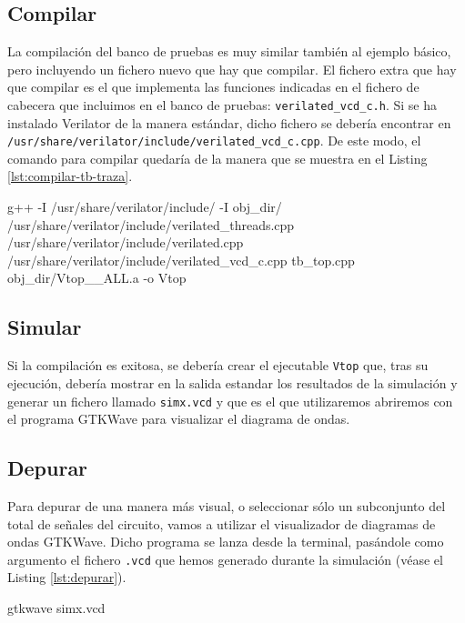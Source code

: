 \subsection{Compilar}
La compilación del banco de pruebas es muy similar también al ejemplo básico, pero incluyendo un fichero nuevo que hay que compilar. El fichero extra que hay que compilar es el que implementa las funciones indicadas en el fichero de cabecera que incluimos en el banco de pruebas: \verb|verilated_vcd_c.h|. Si se ha instalado Verilator de la manera estándar, dicho fichero se debería encontrar en \linebreak\verb|/usr/share/verilator/include/verilated_vcd_c.cpp|. De este modo, el comando para compilar quedaría de la manera que se muestra en el Listing \ref{lst:compilar-tb-traza}.

\begin{mycode}[style=bashstyle, label=lst:compilar-tb-traza, caption={Compilación del banco de pruebas incluyendo el fichero necesario para crear trazas.}]
g++ -I /usr/share/verilator/include/ -I obj_dir/ /usr/share/verilator/include/verilated_threads.cpp /usr/share/verilator/include/verilated.cpp /usr/share/verilator/include/verilated_vcd_c.cpp tb_top.cpp obj_dir/Vtop__ALL.a -o Vtop
\end{mycode}

\subsection{Simular}
Si la compilación es exitosa, se debería crear el ejecutable \verb|Vtop| que, tras su ejecución, debería mostrar en la salida estandar los resultados de la simulación y generar un fichero llamado \verb|simx.vcd| y que es el que utilizaremos abriremos con el programa GTKWave para visualizar el diagrama de ondas.

\subsection{Depurar}
Para depurar de una manera más visual, o seleccionar sólo un subconjunto del total de señales del circuito, vamos a utilizar el visualizador de diagramas de ondas GTKWave. Dicho programa se lanza desde la terminal, pasándole como argumento el fichero \verb|.vcd| que hemos generado durante la simulación (véase el Listing \ref{lst:depurar}).

\begin{mycode}[style=bashstyle, label=lst:depurar, caption={Instrucción para lanzar el programa de visualización de diagramas de ondas.}]
gtkwave simx.vcd
\end{mycode}

